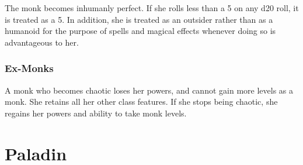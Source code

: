 The monk becomes inhumanly perfect.
If she rolls less than a 5 on any d20 roll, it is treated as a 5.
In addition, she is treated as an outsider rather than as a humanoid for the purpose of spells and magical effects whenever doing so is advantageous to her.

\subsubsection{Ex-Monks}
A monk who becomes chaotic loses her \ki powers, and cannot gain more levels as a monk.
She retains all her other class features.
If she stops being chaotic, she regains her \ki powers and ability to take monk levels.

\section{Paladin}
